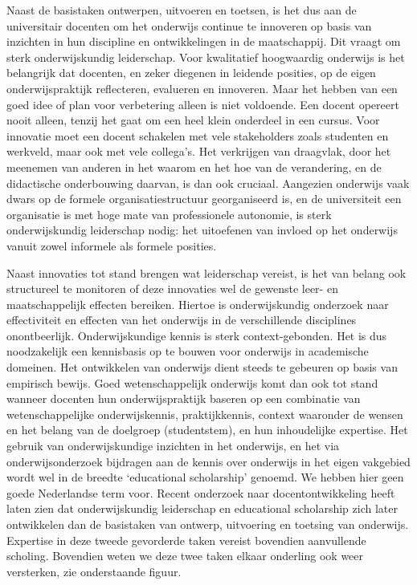 \documentclass{jote-book}
\begin{document}
	Naast de basistaken ontwerpen, uitvoeren en toetsen, is het dus aan de universitair docenten om het onderwijs continue te innoveren op basis van inzichten in hun discipline en ontwikkelingen in de maatschappij. Dit vraagt om sterk onderwijskundig leiderschap. Voor kwalitatief hoogwaardig onderwijs is het belangrijk dat docenten, en zeker diegenen in leidende posities, op de eigen onderwijspraktijk reflecteren, evalueren en innoveren. Maar het hebben van een goed idee of plan voor verbetering alleen is niet voldoende. Een docent opereert nooit alleen, tenzij het gaat om een heel klein onderdeel in een cursus. Voor innovatie moet een docent schakelen met vele stakeholders zoals studenten en werkveld, maar ook met vele collega's. Het verkrijgen van draagvlak, door het meenemen van anderen in het waarom en het hoe van de verandering, en de didactische onderbouwing daarvan, is dan ook cruciaal. Aangezien onderwijs vaak dwars op de formele organisatiestructuur georganiseerd is, en de universiteit een organisatie is met hoge mate van professionele autonomie, is sterk onderwijskundig leiderschap nodig: het uitoefenen van invloed op het onderwijs vanuit zowel informele als formele posities.



	Naast innovaties tot stand brengen wat leiderschap vereist, is het van belang ook structureel te monitoren of deze innovaties wel de gewenste leer- en maatschappelijk effecten bereiken. Hiertoe is onderwijskundig onderzoek naar effectiviteit en effecten van het onderwijs in de verschillende disciplines onontbeerlijk. Onderwijskundige kennis is sterk context-gebonden. Het is dus noodzakelijk een kennisbasis op te bouwen voor onderwijs in academische domeinen. Het ontwikkelen van onderwijs dient steeds te gebeuren op basis van empirisch bewijs. Goed wetenschappelijk onderwijs komt dan ook tot stand wanneer docenten hun onderwijspraktijk baseren op een combinatie van wetenschappelijke onderwijskennis, praktijkkennis, context waaronder de wensen en het belang van de doelgroep (studentstem), en hun inhoudelijke expertise. Het gebruik van onderwijskundige inzichten in het onderwijs, en het via onderwijsonderzoek bijdragen aan de kennis over onderwijs in het eigen vakgebied wordt wel in de breedte ‘educational scholarship' genoemd. We hebben hier geen goede Nederlandse term voor. Recent onderzoek naar docentontwikkeling heeft laten zien dat onderwijskundig leiderschap en educational scholarship zich later ontwikkelen dan de basistaken van ontwerp, uitvoering en toetsing van onderwijs. Expertise in deze tweede gevorderde taken vereist bovendien aanvullende scholing. Bovendien weten we deze twee taken elkaar onderling ook weer versterken, zie onderstaande figuur.
\end{document}
